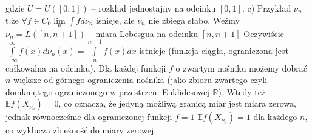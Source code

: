 \documentclass{article}
\begin{document}
gdzie $U=U([0,1])$ -- rozkład jednostajny na odcinku $[0,1]$.
\newline\newline
c) Przykład $\nu_n$ t.że $\forall f\in C_0 \lim\limits_{n}\int fd\nu_n$ isnieje, ale $\nu_n$ nie zbiega słabo.\newline\newline
Weźmy $\nu_n=L([n,n+1])$ -- miara Lebesgua na odcinku $[n,n+1]$\newline
Oczywiście $\int\limits_{-\infty}^{\infty}f(x)d\nu_n(x)=\int\limits_{n}^{n+1}f(x)dx$ istnieje (funkcja ciągła, ograniczona jest całkowalna na odcinku).\newline
Dla każdej funkcji $f$ o zwartym nośniku możemy dobrać $n$ większe od górnego ograniczenia nośnika
(jako zbioru zwartego czyli domkniętego ograniczonego w przestrzeni Euklidesowej $\mathbb{R}$). Wtedy też $\mathbb{E}f(X_{\nu_n})=0$, co oznacza, że jedyną możliwą granicą miar jest
miara zerowa, jednak równocześnie dla ograniczonej funkcji $f=1$ $\mathbb{E}f(X_{\nu_n})=1$ dla każdego $n$, co wyklucza zbieżność do miary zerowej.
\end{document}
